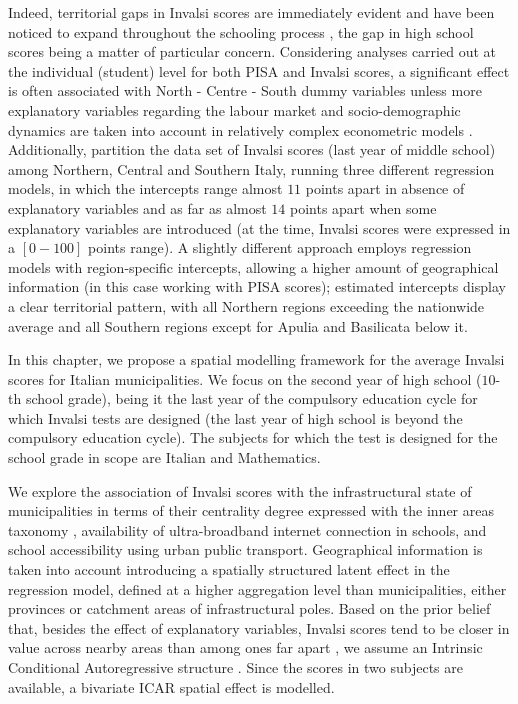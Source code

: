 \documentclass[openany]{book}
\begin{document}
 Indeed, territorial gaps in Invalsi scores are immediately evident and have been noticed to expand throughout the schooling process \citep{Invalsi2020}, the gap in high school scores being a matter of particular concern.  Considering analyses carried out at the individual (student) level for both PISA and Invalsi scores, a significant effect is often associated with North - Centre - South dummy variables  \citep[as in e.g. ][]{Giancola, Bratti, Agasisti, UniromaWP1} unless more explanatory variables regarding the labour market and socio-demographic dynamics are taken into account in relatively complex econometric models \citep{Bratti}. Additionally, \cite{Agasisti} partition the data set of Invalsi scores (last year of middle school) among Northern, Central and Southern Italy, running three different regression models, in which the intercepts range almost $11$ points apart in absence of explanatory variables and as far as almost $14$ points apart when some explanatory variables are introduced (at the time, Invalsi scores were expressed in a $[0-100]$ points range). A slightly different approach employs regression models with region-specific intercepts, allowing a higher amount of geographical information \citep{Matteucci} (in this case working with PISA scores); estimated intercepts display a clear territorial pattern, with all Northern regions exceeding the nationwide average and all Southern regions except for Apulia and Basilicata below it.
 
 In this chapter, we propose a spatial modelling framework for the average Invalsi scores for Italian municipalities. We focus on the second year of high school ($10$-th school grade), being it the last year of the compulsory education cycle for which Invalsi tests are designed (the last year of high school is beyond the compulsory education cycle). The subjects for which the test is designed for the school grade in scope are Italian and Mathematics.

We explore the association of Invalsi scores with the infrastructural state of municipalities in terms of their centrality degree expressed with the inner areas taxonomy \citep{InnerAreas}, availability of ultra-broadband internet connection in schools, and school accessibility using urban public transport. Geographical information is taken into account introducing a spatially structured latent effect in the regression model, defined at a higher aggregation level than municipalities, either provinces or catchment areas of infrastructural poles. Based on the prior belief that, besides the effect of explanatory variables, Invalsi scores tend to be closer in value across nearby areas than among ones far apart \citep{CAR}, we assume an Intrinsic Conditional Autoregressive structure \citep[hereinafter ICAR, ][]{BYM}. Since the scores in two subjects are available, a bivariate ICAR \citep{Mardia} spatial effect is modelled.
\end{document}
